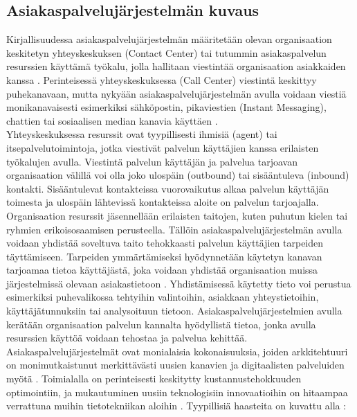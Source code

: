 \documentclass[finnish,12pt,a4paper,pdftex]{article}
\begin{document}
\subsection{Asiakaspalvelujärjestelmän kuvaus}

Kirjallisuudessa asiakaspalvelujärjestelmän määritetään olevan organisaation keskitetyn yhteyskeskuksen (Contact Center) tai tutummin asiakaspalvelun resurssien käyttämä työkalu, jolla hallitaan viestintää organisaation asiakkaiden kanssa \citep{ccinfo, cisco}. Perinteisessä yhteyskeskuksessa (Call Center) viestintä keskittyy puhekanavaan, mutta nykyään asiakaspalvelujärjestelmän avulla voidaan viestiä monikanavaisesti esimerkiksi sähköpostin, pikaviestien (Instant Messaging), chattien tai sosiaalisen median kanavia käyttäen \citep{bernier, latvakoivisto}. \\

Yhteyskeskuksessa resurssit ovat tyypillisesti ihmisiä (agent) tai itsepalvelutoimintoja, jotka viestivät palvelun käyttäjien kanssa erilaisten työkalujen avulla. Viestintä palvelun käyttäjän ja palvelua tarjoavan organisaation välillä voi olla joko ulospäin (outbound) tai sisääntuleva (inbound) kontakti. Sisääntulevat kontakteissa vuorovaikutus alkaa palvelun käyttäjän toimesta ja ulospäin lähtevissä kontakteissa aloite on palvelun tarjoajalla.  \citep{ccinfo} \\

\noindent Organisaation resurssit jäsennellään erilaisten taitojen, kuten puhutun kielen tai ryhmien erikoisosaamisen perusteella\citep{cisco}. Tällöin asiakaspalvelujärjestelmän avulla voidaan yhdistää soveltuva taito tehokkaasti palvelun käyttäjien tarpeiden täyttämiseen. Tarpeiden ymmärtämiseksi hyödynnetään käytetyn kanavan tarjoamaa tietoa käyttäjästä, joka voidaan yhdistää organisaation muissa järjestelmissä olevaan asiakastietoon \citep{ccinfo}. Yhdistämisessä käytetty tieto voi perustua esimerkiksi puhevalikossa tehtyihin valintoihin, asiakkaan yhteystietoihin, käyttäjätunnuksiin tai analysoituun tietoon. Asiakaspalvelujärjestelmien avulla kerätään organisaation palvelun kannalta hyödyllistä tietoa, jonka avulla resurssien käyttöä voidaan tehostaa ja palvelua kehittää.\\

Asiakaspalvelujärjestelmät ovat monialaisia kokonaisuuksia, joiden arkkitehtuuri on monimutkaistunut merkittävästi uusien kanavien ja digitaalisten palveluiden myötä \citep{ccgartner}. Toimialalla on perinteisesti keskitytty kustannustehokkuuden optimointiin, ja mukautuminen uusiin teknologisiin innovaatioihin on hitaampaa verrattuna muihin tietotekniikan aloihin \citep{ccvarkey}. Tyypillisiä haasteita on kuvattu alla \citep{ccvissan}:
\end{document}
